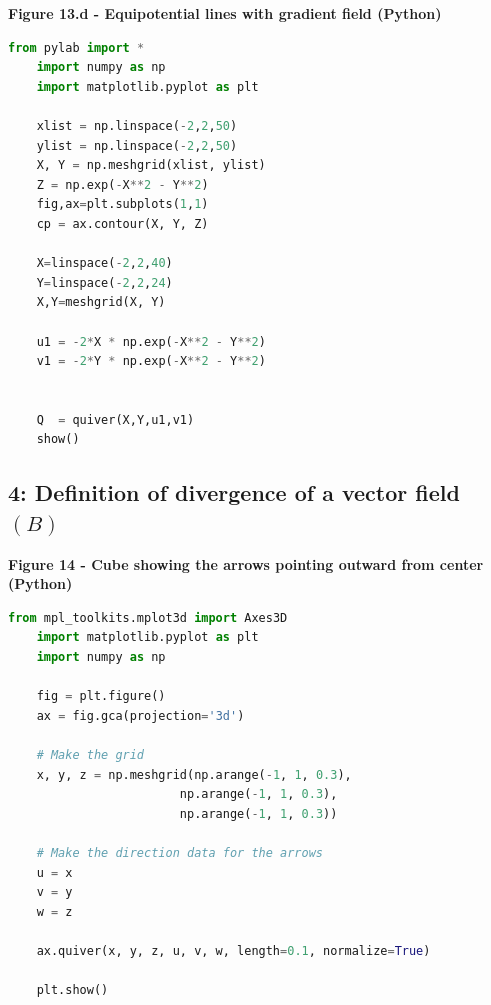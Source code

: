 \documentclass[10pt,a4paper]{article}
\begin{document}
\textbf{Figure 13.d - Equipotential lines with gradient field (Python)} 
\begin{lstlisting}[language=python]
    from pylab import *
    import numpy as np
    import matplotlib.pyplot as plt

    xlist = np.linspace(-2,2,50)
    ylist = np.linspace(-2,2,50)
    X, Y = np.meshgrid(xlist, ylist)
    Z = np.exp(-X**2 - Y**2)
    fig,ax=plt.subplots(1,1)
    cp = ax.contour(X, Y, Z)

    X=linspace(-2,2,40)
    Y=linspace(-2,2,24)
    X,Y=meshgrid(X, Y)

    u1 = -2*X * np.exp(-X**2 - Y**2)
    v1 = -2*Y * np.exp(-X**2 - Y**2)


    Q  = quiver(X,Y,u1,v1)
    show()
\end{lstlisting}

\pagebreak
\subsection{4: Definition of divergence of a vector field $(B)$}

\textbf{Figure 14 - Cube showing the arrows pointing outward from center (Python)}
\begin{lstlisting}[language=python]
    from mpl_toolkits.mplot3d import Axes3D 
    import matplotlib.pyplot as plt
    import numpy as np

    fig = plt.figure()
    ax = fig.gca(projection='3d')

    # Make the grid
    x, y, z = np.meshgrid(np.arange(-1, 1, 0.3),
                        np.arange(-1, 1, 0.3),
                        np.arange(-1, 1, 0.3))

    # Make the direction data for the arrows
    u = x
    v = y
    w = z

    ax.quiver(x, y, z, u, v, w, length=0.1, normalize=True)

    plt.show()
\end{lstlisting}

\end{document}
